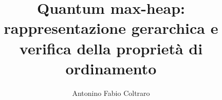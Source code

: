 \documentclass[12pt,a4paper,openany,oneside]{book}
\begin{document}



\title{Quantum max-heap: rappresentazione gerarchica e verifica della proprietà di ordinamento}
\author{Antonino Fabio Coltraro}





\tableofcontents








\newpage
{}

\end{document}
